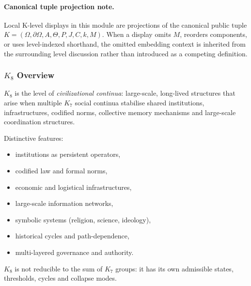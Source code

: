 



\paragraph{Canonical tuple projection note.}
Local K-level displays in this module are projections of the canonical public tuple \(K=(\Omega,\partial\Omega,A,\Theta,P,J,C,k,M)\). When a display omits \(M\), reorders components, or uses level-indexed shorthand, the omitted embedding context is inherited from the surrounding level discussion rather than introduced as a competing definition.

\subsubsection{\texorpdfstring{$K_8$}{K_8} Overview}
\label{sec:k8-overview}

$K_8$ is the level of \emph{civilizational continua}: large-scale,
long-lived structures that arise when multiple $K_7$ social continua
stabilise shared institutions, infrastructures, codified norms,
collective memory mechanisms and large-scale coordination structures.

Distinctive features:
\begin{itemize}
    \item institutions as persistent operators,
    \item codified law and formal norms,
    \item economic and logistical infrastructures,
    \item large-scale information networks,
    \item symbolic systems (religion, science, ideology),
    \item historical cycles and path-dependence,
    \item multi-layered governance and authority.
\end{itemize}

$K_8$ is not reducible to the sum of $K_7$ groups: it has its own
admissible states, thresholds, cycles and collapse modes.

